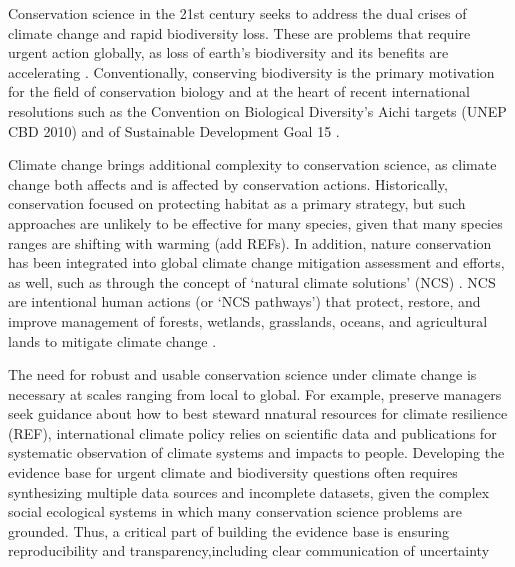 \documentclass{article}
\begin{document}
\par Conservation science in the 21st century seeks to address the dual crises of  climate change and rapid biodiversity loss. These are problems that require urgent action globally, as loss of earth's biodiversity and its benefits are accelerating \citep{brondizio2019assessing, ripple2017extinction,tittensor2014mid}. Conventionally, conserving biodiversity is the primary motivation for the field of conservation biology \citep{williams2020past} and at the heart of recent international resolutions such as the Convention on Biological Diversity's Aichi targets (UNEP CBD 2010) and of Sustainable Development Goal 15 \citep{assembly2015resolution}. 
\par Climate change brings additional complexity to conservation science, as climate change both affects and is affected by conservation actions. Historically, conservation focused on protecting habitat as a primary strategy, but such approaches are unlikely to be effective for many species, given that many species ranges are shifting with warming (add REFs). In addition, nature conservation has been integrated into global climate change mitigation assessment and efforts, as well, such as through the concept of `natural climate solutions’ (NCS) \citep{Ellis2024}. NCS are intentional human actions (or `NCS pathways') that protect, restore, and improve management of forests, wetlands, grasslands, oceans, and agricultural lands to mitigate climate change \citep{griscom2017natural}.

\par The need for robust and usable conservation science under climate change is necessary at scales ranging from local to global. For example, preserve managers seek guidance about how to best steward nnatural resources for climate resilience (REF), international climate policy relies on scientific data and publications for systematic observation of climate systems and impacts to people. Developing the evidence base for urgent climate and biodiversity questions often requires synthesizing multiple data sources and incomplete datasets, given the complex social ecological systems in which many conservation science problems are grounded. Thus, a critical part of building the evidence base is ensuring reproducibility and transparency,including clear communication of uncertainty \citep{Ellis2024,ipcc2007} 
\end{document}
